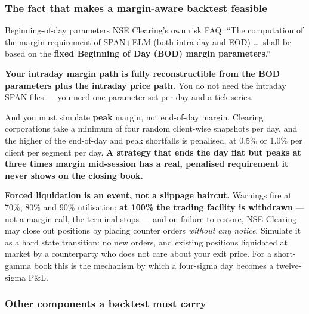 \documentclass[11pt,a4paper]{article}
\begin{document}
\subsubsection{The fact that makes a margin-aware backtest feasible}

\begin{keyfact}{Beginning-of-day parameters}
NSE Clearing's own risk FAQ: ``The computation of the margin requirement of
SPAN$+$ELM (both intra-day and EOD) \ldots\ shall be based on the \textbf{fixed
Beginning of Day (BOD) margin parameters}.''

\textbf{Your intraday margin path is fully reconstructible from the BOD parameters
plus the intraday price path.} You do not need the intraday SPAN files --- you
need one parameter set per day and a tick series.
\end{keyfact}

And you must simulate \textbf{peak} margin, not end-of-day margin. Clearing
corporations take a minimum of four random client-wise snapshots per day, and the
higher of the end-of-day and peak shortfalls is penalised, at 0.5\% or 1.0\% per
client per segment per day. \textbf{A strategy that ends the day flat but peaks at
three times margin mid-session has a real, penalised requirement it never shows on
the closing book.}

\textbf{Forced liquidation is an event, not a slippage haircut.} Warnings fire at
70\%, 80\% and 90\% utilisation; \textbf{at 100\% the trading facility is
withdrawn} --- not a margin call, the terminal stops --- and on failure to restore,
NSE Clearing may close out positions by placing counter orders \emph{without any
notice}. Simulate it as a hard state transition: no new orders, and existing
positions liquidated at market by a counterparty who does not care about your exit
price. For a short-gamma book this is the mechanism by which a four-sigma day
becomes a twelve-sigma P\&L.

\subsubsection{Other components a backtest must carry}
\end{document}
